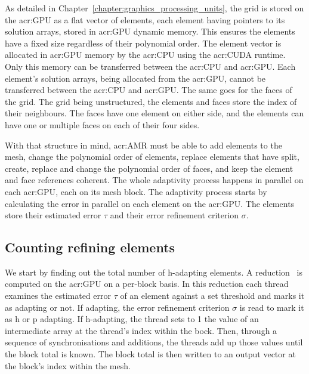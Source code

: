 As detailed in Chapter~\ref{chapter:graphics_processing_units}, the grid is stored on the
\acrshort{acr:GPU} as a flat vector of elements, each element having pointers to its solution
arrays, stored in \acrshort{acr:GPU} dynamic memory. This ensures the elements have a fixed size
regardless of their polynomial order. The element vector is allocated in \acrshort{acr:GPU} memory
by the \acrshort{acr:CPU} using the \acrshort{acr:CUDA} runtime. Only this memory can be transferred
between the \acrshort{acr:CPU} and \acrshort{acr:GPU}. Each element's solution arrays, being
allocated from the \acrshort{acr:GPU}, cannot be transferred between the \acrshort{acr:CPU} and
\acrshort{acr:GPU}. The same goes for the faces of the grid. The grid being unstructured, the
elements and faces store the index of their neighbours. The faces have one element on either side,
and the elements can have one or multiple faces on each of their four sides.

With that structure in mind, \acrlong{acr:AMR} must be able to add elements to the mesh, change the
polynomial order of elements, replace elements that have split, create, replace and change the
polynomial order of faces, and keep the element and face references coherent. The whole adaptivity
process happens in parallel on each \acrshort{acr:GPU}, each on its mesh block. The adaptivity
process starts by calculating the error in parallel on each element on the \acrshort{acr:GPU}. The
elements store their estimated error \(\tau \) and their error refinement criterion \(\sigma \).

\subsection{Counting refining elements}\label{subsection:adaptive_mesh_refinement:implementation:counting_refining_elements}


We start by finding out the total number of h-adapting elements. A reduction~\cite{Harris2007} is
computed on the \acrshort{acr:GPU} on a per-block basis. In this reduction each thread examines the
estimated error \(\tau \) of an element against a set threshold and marks it as adapting or not. If
adapting, the error refinement criterion \(\sigma \) is read to mark it as h or p adapting. If
h-adapting, the thread sets to 1 the value of an intermediate array at the thread's index within the
bock. Then, through a sequence of synchronisations and additions, the threads add up those values
until the block total is known. The block total is then written to an output vector at the block's
index within the mesh.

